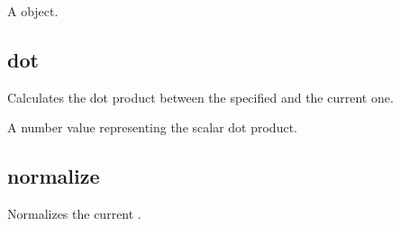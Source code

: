 \documentclass[letterpaper,12pt,english,openany,oneside]{sphinxmanual}
\begin{document}
\label{\detokenize{JS_3D_API:syntax-135}}

\begin{sphinxVerbatim}[commandchars=\\\{\}]
\end{sphinxVerbatim}
\label{\detokenize{JS_3D_API:parameters-97}}

\label{\detokenize{JS_3D_API:section-135}}\label{\detokenize{JS_3D_API:returns-136}}

A  object.


\subsection{dot}
\label{\detokenize{JS_3D_API:dot}}
Calculates the dot product between the specified  and the current one.

\label{\detokenize{JS_3D_API:syntax-136}}

\begin{sphinxVerbatim}[commandchars=\\\{\}]
\end{sphinxVerbatim}
\label{\detokenize{JS_3D_API:parameters-98}}

\label{\detokenize{JS_3D_API:section-136}}\label{\detokenize{JS_3D_API:returns-137}}

A number value representing the scalar dot product.


\subsection{normalize}
\label{\detokenize{JS_3D_API:normalize-1}}\label{\detokenize{JS_3D_API:id46}}
Normalizes the current .

\label{\detokenize{JS_3D_API:syntax-137}}

\begin{sphinxVerbatim}[commandchars=\\\{\}]
\end{sphinxVerbatim}
\label{\detokenize{JS_3D_API:returns-138}}
\end{document}
